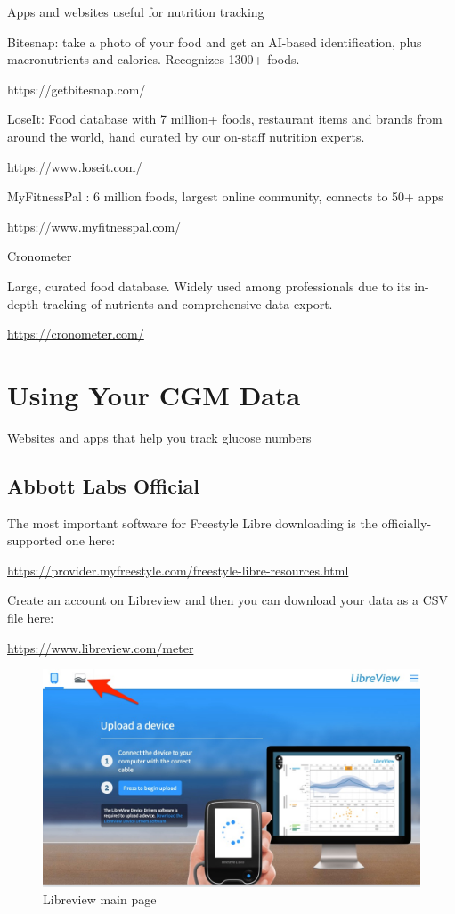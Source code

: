 \documentclass[
]{book}
\begin{document}
Apps and websites useful for nutrition tracking

Bitesnap: take a photo of your food and get an AI-based identification, plus macronutrients and calories. Recognizes 1300+ foods.

https://getbitesnap.com/

LoseIt: Food database with 7 million+ foods, restaurant items and brands from around the world, hand curated by our on-staff nutrition experts.

https://www.loseit.com/

MyFitnessPal : 6 million foods, largest online community, connects to 50+ apps

\url{https://www.myfitnesspal.com/}

Cronometer

Large, curated food database. Widely used among professionals due to its in-depth tracking of nutrients and comprehensive data export.

\url{https://cronometer.com/}

\hypertarget{using-your-cgm-data}{%
\chapter{Using Your CGM Data}\label{using-your-cgm-data}}

Websites and apps that help you track glucose numbers

\hypertarget{abbott-labs-official}{%
\section{Abbott Labs Official}\label{abbott-labs-official}}

The most important software for Freestyle Libre downloading is the officially-supported one here:

\url{https://provider.myfreestyle.com/freestyle-libre-resources.html}

Create an account on Libreview and then you can download your data as a CSV file here:

\url{https://www.libreview.com/meter}

\begin{figure}
\centering
\includegraphics{images/freestyle-download.jpg}
\caption{Libreview main page}
\end{figure}
\end{document}
